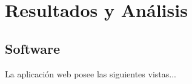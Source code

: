 \chapter{Resultados y Análisis}

\section{Software}

La aplicación web posee las siguientes vistas...